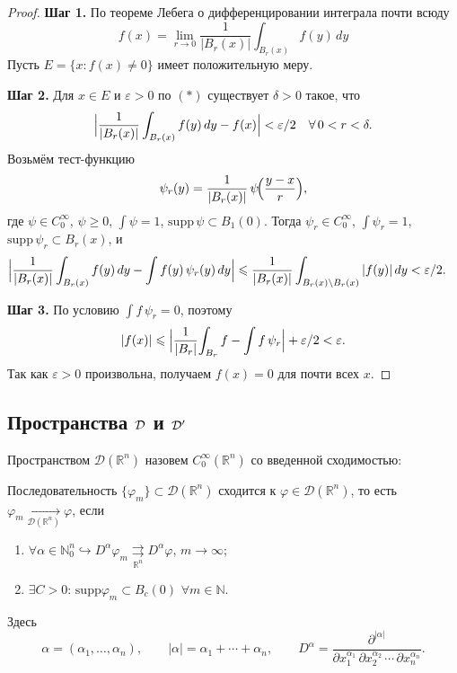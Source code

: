\begin{proof}
    \textbf{Шаг 1.}
    По теореме Лебега о дифференцировании интеграла почти всюду
    \[
        f(x)
        =\lim_{r\to0}\frac1{|B_r(x)|}\int_{B_r(x)}f(y)\,dy
        \tag{$*$}
    \]
    Пусть $E=\{x:f(x)\neq0\}$ имеет положительную меру.

    \textbf{Шаг 2.}
    Для $x\in E$ и $\varepsilon>0$ по $(*)$ существует $\delta>0$ такое, что
    \[
        \Bigl|\frac1{|B_r(x)|}\int_{B_r(x)}f(y)\,dy - f(x)\Bigr|<\varepsilon/2
        \quad
        \forall\,0<r<\delta.
    \]
    Возьмём тест-функцию
    \[
        \psi_r(y)
        =\frac1{|B_r(x)|}\,\psi\!\Bigl(\frac{y-x}{r}\Bigr),
    \]
    где $\psi\in C_0^\infty$, $\psi\ge0$, $\int\psi=1$, $\mathrm{supp}\,\psi\subset B_1(0)$.
    Тогда $\psi_r\in C_0^\infty$, $\int\psi_r=1$, $\mathrm{supp}\,\psi_r\subset B_r(x)$, и
    \begin{align*}
        \Bigl|\frac1{|B_r(x)|}\int_{B_r(x)}f(y)\,dy - \int f(y)\,\psi_r(y)\,dy\Bigr|
        &\le
        \frac1{|B_r(x)|}\int_{B_{r}(x)\setminus B_r(x)}|f(y)|\,dy
        <\varepsilon/2.
    \end{align*}

    \textbf{Шаг 3.}
    По условию $\int f\,\psi_r=0$, поэтому
    \[
        |f(x)| \le \Bigl|\frac1{|B_r|}\!\int_{B_r}f - \int f\,\psi_r\Bigr| + \varepsilon/2
        <\varepsilon.
    \]
    Так как $\varepsilon>0$ произвольна, получаем $f(x)=0$ для почти всех $x$.
\end{proof}

\subsection{Пространства $\D$ и $\D'$}

\begin{definition}
    Пространством $\mathcal{D}(\mathbb{R}^n)$ назовем $C_0^\infty(\mathbb{R}^n)$ со введенной сходимостью:

    Последовательность $\{ \varphi_m\} \subset \mathcal{D}(\mathbb{R}^n)$ сходится к $\varphi \in \mathcal{D}(\mathbb{R}^n)$, то есть $\varphi_m \xrightarrow[\mathcal{D}(\mathbb{R}^n)]{} \varphi$, если
    \begin{enumerate}
        \item $\forall \alpha \in \mathbb{N}^n_0 \hookrightarrow D^{\alpha} \varphi_m \mathrel{\mathop{\rightrightarrows}\limits_{\mathbb{R}^n}} D^{\alpha} \varphi$, $m \to \infty$;
        \item $\exists C > 0$: $\text{supp}\varphi_m \subset B_c(0)$ $\forall m \in \mathbb{N}$.
    \end{enumerate}

    Здесь
    \[
        \alpha = (\alpha_1, \ldots, \alpha_n), \qquad
        |\alpha|=\alpha_1+\cdots+\alpha_n,
        \qquad
        D^\alpha
        =\frac{\partial^{|\alpha|}}{\partial x_1^{\alpha_1}\,\partial x_2^{\alpha_2}\,\cdots\,\partial x_n^{\alpha_n}}.
    \]
\end{definition}

